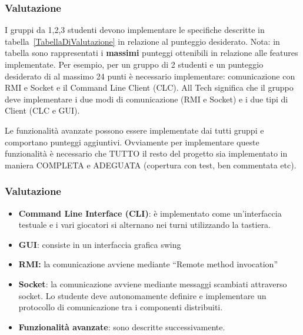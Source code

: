 \documentclass{beamer}
\begin{document}
\begin{frame}
\frametitle{Valutazione}
I gruppi da 1,2,3 studenti devono implementare  le specifiche
descritte in tabella~\ref{TabellaDiValutazione} in relazione al
punteggio desiderato. Nota: in tabella sono rappresentati i
\textbf{massimi} punteggi ottenibili in relazione alle features
implementate. Per esempio, per un gruppo di 2 studenti e un punteggio
desiderato di al massimo 24 punti \`e necessario implementare:
comunicazione con RMI e Socket e il Command Line Client (CLC).
All Tech significa che il gruppo deve implementare i due modi di
comunicazione (RMI e Socket) e i due tipi di Client (CLC e GUI).

Le funzionalit\`a avanzate possono essere implementate dai tutti gruppi e comportano punteggi aggiuntivi. Ovviamente per implementare queste funzionalit\`a \`e necessario che TUTTO il resto del progetto sia implementato in maniera COMPLETA e ADEGUATA (copertura con test, ben commentata etc).
\end{frame}



\begin{frame}
\frametitle{Valutazione}
\begin{itemize}
\item \textbf{Command Line Interface (CLI)}: \`e implementato come un'interfaccia testuale e i vari giocatori si alternano nei turni utilizzando la tastiera.
\item \textbf{GUI}: consiste in un interfaccia grafica swing
\item \textbf{RMI:} la comunicazione avviene mediante ``Remote method invocation''
\item \textbf{Socket}: la comunicazione avviene mediante messaggi scambiati
  attraverso socket. Lo studente deve autonomamente definire e
  implementare un protocollo di comunicazione tra i componenti distribuiti.
\item \textbf{Funzionalit\`a avanzate}: sono descritte successivamente.
\end{itemize}
\end{frame}
\end{document}
